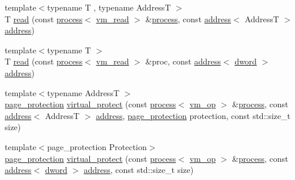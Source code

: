 \begin{DoxyCompactItemize}
\item 
{\footnotesize template$<$typename T , typename AddressT $>$ }\\T \mbox{\hyperlink{namespacedistant_1_1memory_a5a24d0d196510d8789b81010723809e9}{read}} (const \mbox{\hyperlink{classdistant_1_1kernel__objects_1_1process}{process}}$<$ \mbox{\hyperlink{namespacedistant_a671e87e004e808bfc0d54a4e816981df}{vm\+\_\+read}} $>$ \&\mbox{\hyperlink{classdistant_1_1kernel__objects_1_1process}{process}}, const \mbox{\hyperlink{classdistant_1_1memory_1_1address}{address}}$<$ AddressT $>$ \mbox{\hyperlink{classdistant_1_1memory_1_1address}{address}})
\item 
{\footnotesize template$<$typename T $>$ }\\T \mbox{\hyperlink{namespacedistant_1_1memory_abf084cc29320d1031fd87b0daa6820e1}{read}} (const \mbox{\hyperlink{classdistant_1_1kernel__objects_1_1process}{process}}$<$ \mbox{\hyperlink{namespacedistant_a671e87e004e808bfc0d54a4e816981df}{vm\+\_\+read}} $>$ \&proc, const \mbox{\hyperlink{classdistant_1_1memory_1_1address}{address}}$<$ \mbox{\hyperlink{namespacedistant_a9fa41a5a1a17dcbd24da1c1855c92489}{dword}} $>$ \mbox{\hyperlink{classdistant_1_1memory_1_1address}{address}})
\item 
{\footnotesize template$<$typename AddressT $>$ }\\\mbox{\hyperlink{structdistant_1_1access__rights_a09c6caea8f570f8e2d18c3ef2e2a7804}{page\+\_\+protection}} \mbox{\hyperlink{namespacedistant_1_1memory_a68ad702e80d06667f99122f69c2dcbad}{virtual\+\_\+protect}} (const \mbox{\hyperlink{classdistant_1_1kernel__objects_1_1process}{process}}$<$ \mbox{\hyperlink{namespacedistant_af02d4223cd2f509cc373ac9d83655f19}{vm\+\_\+op}} $>$ \&\mbox{\hyperlink{classdistant_1_1kernel__objects_1_1process}{process}}, const \mbox{\hyperlink{classdistant_1_1memory_1_1address}{address}}$<$ AddressT $>$ \mbox{\hyperlink{classdistant_1_1memory_1_1address}{address}}, \mbox{\hyperlink{structdistant_1_1access__rights_a09c6caea8f570f8e2d18c3ef2e2a7804}{page\+\_\+protection}} protection, const std\+::size\+\_\+t size)
\item 
{\footnotesize template$<$page\+\_\+protection Protection$>$ }\\\mbox{\hyperlink{structdistant_1_1access__rights_a09c6caea8f570f8e2d18c3ef2e2a7804}{page\+\_\+protection}} \mbox{\hyperlink{namespacedistant_1_1memory_a3544f90cd68f7f91601b0f84f04c6000}{virtual\+\_\+protect}} (const \mbox{\hyperlink{classdistant_1_1kernel__objects_1_1process}{process}}$<$ \mbox{\hyperlink{namespacedistant_af02d4223cd2f509cc373ac9d83655f19}{vm\+\_\+op}} $>$ \&\mbox{\hyperlink{classdistant_1_1kernel__objects_1_1process}{process}}, const \mbox{\hyperlink{classdistant_1_1memory_1_1address}{address}}$<$ \mbox{\hyperlink{namespacedistant_a9fa41a5a1a17dcbd24da1c1855c92489}{dword}} $>$ \mbox{\hyperlink{classdistant_1_1memory_1_1address}{address}}, const std\+::size\+\_\+t size)

\end{DoxyCompactItemize}
